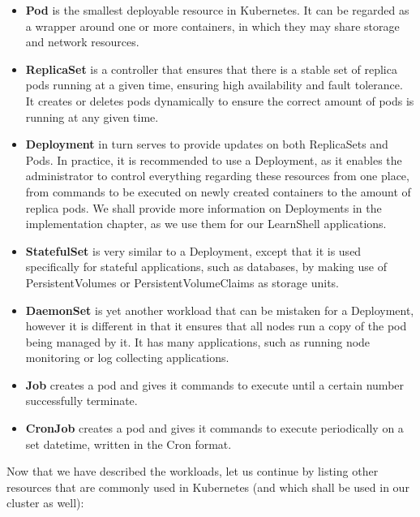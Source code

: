 \documentclass[thesis=B,english]{FITthesis}[2019/12/23]
\begin{document}
\begin{itemize}
  \setlength\itemsep{0em}
  \item \textbf{Pod} is the smallest deployable resource in Kubernetes. It can be regarded as a wrapper around one or more containers, in which they may share storage and network resources.
  \item \textbf{ReplicaSet} is a controller that ensures that there is a stable set of replica pods running at a given time, ensuring high availability and fault tolerance. It creates or deletes pods dynamically to ensure the correct amount of pods is running at any given time.
  \item \textbf{Deployment} in turn serves to provide updates on both ReplicaSets and Pods. In practice, it is recommended to use a Deployment, as it enables the administrator to control everything regarding these resources from one place, from commands to be executed on newly created containers to the amount of replica pods. We shall provide more information on Deployments in the implementation chapter, as we use them for our LearnShell applications.
  \item \textbf{StatefulSet} is very similar to a Deployment, except that it is used specifically for stateful applications, such as databases, by making use of PersistentVolumes or PersistentVolumeClaims as storage units.
  \item \textbf{DaemonSet} is yet another workload that can be mistaken for a Deployment, however it is different in that it ensures that all nodes run a copy of the pod being managed by it. It has many applications, such as running node monitoring or log collecting applications.
  \item \textbf{Job} creates a pod and gives it commands to execute until a certain number successfully terminate.
  \item \textbf{CronJob} creates a pod and gives it commands to execute periodically on a set datetime, written in the Cron format.
\end{itemize}

Now that we have described the workloads, let us continue by listing other resources that are commonly used in Kubernetes (and which shall be used in our cluster as well):
\end{document}
